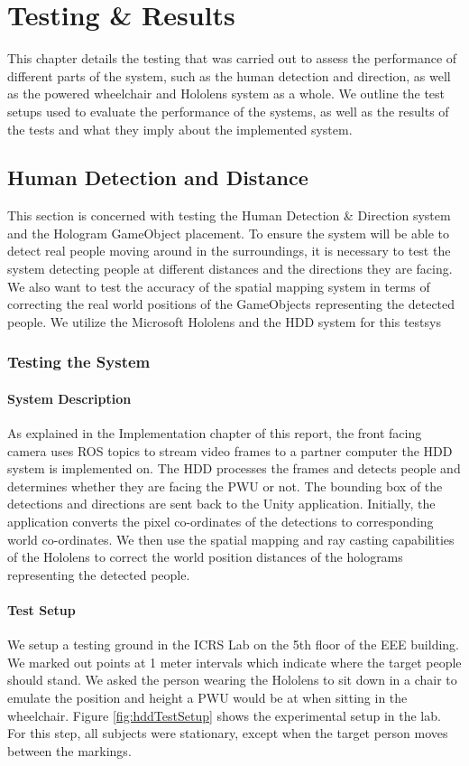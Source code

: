 \chapter{Testing \& Results}
This chapter details the testing that was carried out to assess the performance of different parts of the system, such as the human detection and direction, as well as the powered wheelchair and Hololens system as a whole. We outline the test setups used to evaluate the performance of the systems, as well as the results of the tests and what they imply about the implemented system.

\section{Human Detection and Distance}
This section is concerned with testing the Human Detection \& Direction system and the Hologram GameObject placement. To ensure the system will be able to detect real people moving around in the surroundings, it is necessary to test the system detecting people at different distances and the directions they are facing. We also want to test the accuracy of the spatial mapping system in terms of correcting the real world positions of the GameObjects representing the detected people. We utilize the Microsoft Hololens and the HDD system for this testsys
\subsection{Testing the System}
\subsubsection{System Description}
As explained in the Implementation chapter of this report, the front facing camera uses ROS topics to stream video frames to a partner computer the HDD system is implemented on. The HDD processes the frames and detects people and determines whether they are facing the PWU or not. The bounding box of the detections and directions are sent back to the Unity application. Initially, the application converts the pixel co-ordinates of the detections to corresponding world co-ordinates. We then use the spatial mapping and ray casting capabilities of the Hololens to correct the world position distances of the holograms representing the detected people.

\subsubsection{Test Setup}
We setup a testing ground in the ICRS Lab on the 5th floor of the EEE building. We marked out points at 1 meter intervals which indicate where the target people should stand. We asked the person wearing the Hololens to sit down in a chair to emulate the position and height a PWU would be at when sitting in the wheelchair. Figure \ref{fig:hddTestSetup} shows the experimental setup in the lab. For this step, all subjects were stationary, except when the target person moves between the markings.

